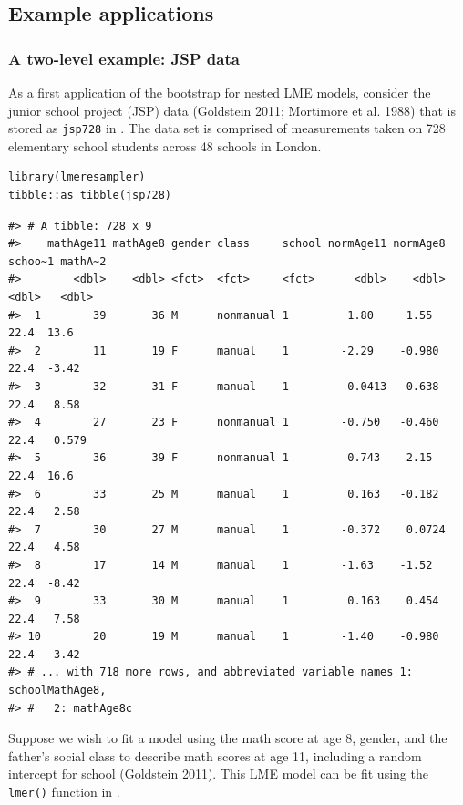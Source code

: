 \hypertarget{example-applications}{%
\subsection{Example applications}\label{example-applications}}

\hypertarget{a-two-level-example-jsp-data}{%
\subsubsection{A two-level example: JSP data}\label{a-two-level-example-jsp-data}}

As a first application of the bootstrap for nested LME models, consider the junior school project (JSP) data (Goldstein 2011; Mortimore et al. 1988) that is stored as \texttt{jsp728} in . The data set is comprised of measurements taken on 728 elementary school students across 48 schools in London.

\begin{verbatim}
library(lmeresampler)
tibble::as_tibble(jsp728)
\end{verbatim}

\begin{verbatim}
#> # A tibble: 728 x 9
#>    mathAge11 mathAge8 gender class     school normAge11 normAge8 schoo~1 mathA~2
#>        <dbl>    <dbl> <fct>  <fct>     <fct>      <dbl>    <dbl>   <dbl>   <dbl>
#>  1        39       36 M      nonmanual 1         1.80     1.55      22.4  13.6  
#>  2        11       19 F      manual    1        -2.29    -0.980     22.4  -3.42 
#>  3        32       31 F      manual    1        -0.0413   0.638     22.4   8.58 
#>  4        27       23 F      nonmanual 1        -0.750   -0.460     22.4   0.579
#>  5        36       39 F      nonmanual 1         0.743    2.15      22.4  16.6  
#>  6        33       25 M      manual    1         0.163   -0.182     22.4   2.58 
#>  7        30       27 M      manual    1        -0.372    0.0724    22.4   4.58 
#>  8        17       14 M      manual    1        -1.63    -1.52      22.4  -8.42 
#>  9        33       30 M      manual    1         0.163    0.454     22.4   7.58 
#> 10        20       19 M      manual    1        -1.40    -0.980     22.4  -3.42 
#> # ... with 718 more rows, and abbreviated variable names 1: schoolMathAge8,
#> #   2: mathAge8c
\end{verbatim}

Suppose we wish to fit a model using the math score at age 8, gender, and the father's social class to describe math scores at age 11, including a random intercept for school (Goldstein 2011). This LME model can be fit using the \texttt{lmer()} function in .

